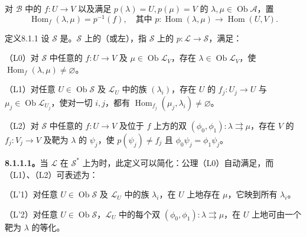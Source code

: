 对 $\mathscr B$ 中的 $f:U\to V$ 以及满足 $p(\lambda)=U,p(\mu)=V$ 的 $\lambda,\mu\in\operatorname{Ob}\mathscr A$，置
\[\operatorname{Hom}_f(\lambda,\mu)=p^{-1}(f),\quad\text{其中 }p:\operatorname{Hom}(\lambda,\mu)\to\operatorname{Hom}(U,V).\]
\begin{SGAresult}{定义}{8.1.1}
设 $\mathscr S$ 是。$\mathscr S$ 上的（或左），指 $\mathscr S$ 上的 $p:\mathscr L\to\mathscr S$，满足：

（L0）对 $\mathscr S$ 中任意的 $f:U\to V$ 及 $\mu\in\operatorname{Ob}\mathscr L_V$，存在 $\lambda\in\operatorname{Ob}\mathscr L_V$，使 $\operatorname{Hom}_f(\lambda,\mu)\ne\varnothing$。

（L1）对任意 $U\in\operatorname{Ob}\mathscr S$ 及 $\mathscr L_U$ 中的族 $(\lambda_i)$，存在 $U$ 的 $f_j:U_j\to U$ 与 $\mu_j\in\operatorname{Ob}\mathscr L_{U_j}$，使对一切 $i,j$，都有 $\operatorname{Hom}_{f_j}(\mu_j,\lambda_i)\ne\varnothing$。

（L2）对 $\mathscr S$ 中任意的 $f:U\to V$ 及位于 $f$ 上方的双 $(\phi_0,\phi_1):\lambda\rightrightarrows\mu$，存在 $V$ 的 $f_j:V_j\to V$ 及靶为 $\lambda$ 的 $\psi_j$，使 $p(\psi_j)\ne f_j$ 且 $\phi_0\psi_j=\phi_1\psi_j$。
\end{SGAresult}
\textbf{8.1.1.1。}当 $\mathscr L$ 在 $\mathscr S^*$ 上为时，此定义可以简化：公理（L0）自动满足，而（L1）、（L2）可表述为：

（L'1）对任意 $U\in\operatorname{Ob}\mathscr S$ 及 $\mathscr L_U$ 中的族 $\lambda_i$，在 $U$ 上地存在 $\mu$，它映到所有 $\lambda_i$。

（L'2）对任意 $U\in\operatorname{Ob}\mathscr S$，$\mathscr L_U$ 中的每个双 $(\phi_0,\phi_1):\lambda\rightrightarrows\mu$，在 $U$ 上地可由一个靶为 $\lambda$ 的等化。

